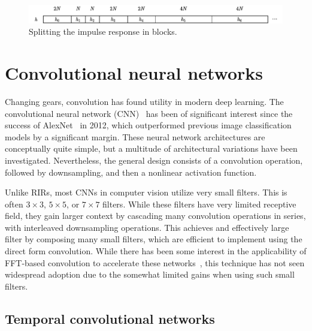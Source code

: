 \documentclass{article}
\begin{document}
\begin{figure}[h]
    \centering
    \includegraphics[width=\linewidth]{figures/blocks.pdf}
    \caption{Splitting the impulse response in blocks.}
    \label{fig:blocks}
\end{figure}

\section{Convolutional neural networks}\label{sec:conv}

Changing gears, convolution has found utility in modern deep learning. 
The convolutional neural network (CNN)~\cite{lecun1998gradient} has been of significant interest since
the success of AlexNet~\cite{krizhevsky2012imagenet} in 2012, 
which outperformed previous image classification models by a significant margin.
These neural network architectures are conceptually quite simple,
but a multitude of architectural variations have been investigated.
Nevertheless, the general design consists of a convolution operation, 
followed by downsampling, and then a nonlinear activation function. 

Unlike RIRs, most CNNs in computer vision utilize very small filters. 
This is often $3 \times 3$, $5 \times 5$, or $7 \times 7$ filters. 
While these filters have very limited receptive field, 
they gain larger context by cascading many convolution operations in series, 
with interleaved downsampling operations.
This achieves and effectively large filter by composing many small filters, 
which are efficient to implement using the direct form convolution. 
While there has been some interest in the applicability of FFT-based convolution 
to accelerate these networks~\cite{vasilyev2015cnn, lavin2016fast, abtahi2017accelerating, abtahi2018accelerating}, 
this technique has not seen widespread adoption 
due to the somewhat limited gains when using such small filters. 

\subsection{Temporal convolutional networks}
\end{document}
